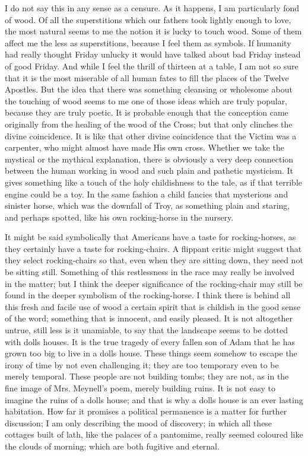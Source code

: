 \documentclass{book}
\begin{document}
I do not say this in any sense as a censure. As it happens, I am particularly fond of wood. Of all the superstitions which our fathers took lightly enough to love, the most natural seems to me the notion it is lucky to touch wood. Some of them affect me the less as superstitions, because I feel them as symbols. If humanity had really thought Friday unlucky it would have talked about bad Friday instead of good Friday. And while I feel the thrill of thirteen at a table, I am not so sure that it is the most miserable of all human fates to fill the places of the Twelve Apostles. But the idea that there was something cleansing or wholesome about the touching of wood seems to me one of those ideas which are truly popular, because they are truly poetic. It is probable enough that the conception came originally from the healing of the wood of the Cross; but that only clinches the divine coincidence. It is like that other divine coincidence that the Victim was a carpenter, who might almost have made His own cross. Whether we take the mystical or the mythical explanation, there is obviously a very deep connection between the human working in wood and such plain and pathetic mysticism. It gives something like a touch of the holy childishness to the tale, as if that terrible engine could be a toy. In the same fashion a child fancies that mysterious and sinister horse, which was the downfall of Troy, as something plain and staring, and perhaps spotted, like his own rocking-horse in the nursery.

It might be said symbolically that Americans have a taste for rocking-horses, as they certainly have a taste for rocking-chairs. A flippant critic might suggest that they select rocking-chairs so that, even when they are sitting down, they need not be sitting still. Something of this restlessness in the race may really be involved in the matter; but I think the deeper significance of the rocking-chair may still be found in the deeper symbolism of the rocking-horse. I think there is behind all this fresh and facile use of wood a certain spirit that is childish in the good sense of the word; something that is innocent, and easily pleased. It is not altogether untrue, still less is it unamiable, to say that the landscape seems to be dotted with dolls houses. It is the true tragedy of every fallen son of Adam that he has grown too big to live in a dolls house. These things seem somehow to escape the irony of time by not even challenging it; they are too temporary even to be merely temporal. These people are not building tombs; they are not, as in the fine image of Mrs. Meynell’s poem, merely building ruins. It is not easy to imagine the ruins of a dolls house; and that is why a dolls house is an ever lasting habitation. How far it promises a political permanence is a matter for further discussion; I am only describing the mood of discovery; in which all these cottages built of lath, like the palaces of a pantomime, really seemed coloured like the clouds of morning; which are both fugitive and eternal.
\end{document}
